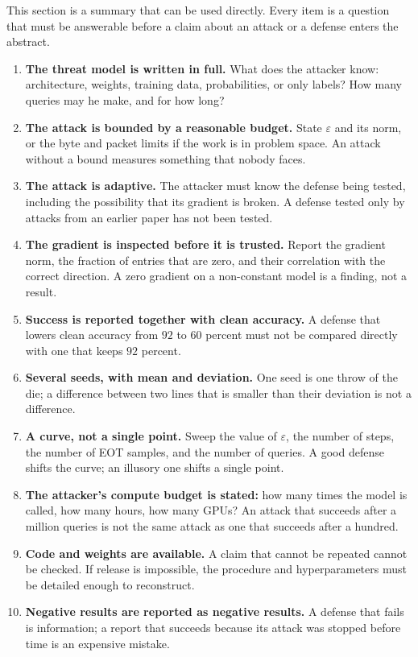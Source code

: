 This section is a summary that can be used directly. Every item is a question
that must be answerable before a claim about an attack or a defense enters the
abstract.

\begin{enumerate}
  \item \textbf{The threat model is written in full.} What does the attacker know: architecture,
        weights, training data, probabilities, or only labels? How many queries may he
        make, and for how long?
  \item \textbf{The attack is bounded by a reasonable budget.} State $\varepsilon$
        and its norm, or the byte and packet limits if the work is in problem space. An attack
        without a bound measures something that nobody faces.
  \item \textbf{The attack is adaptive.}
        The attacker must know the defense being tested, including the possibility that
        its gradient is broken. A defense tested only by attacks from an earlier
        paper has not been tested.
  \item \textbf{The gradient is inspected before it is trusted.} Report the gradient norm, the fraction
        of entries that are zero, and their correlation with the correct direction. A zero gradient on a
        non-constant model is a finding, not a result.
  \item \textbf{Success is reported together with clean accuracy.} A defense that
        lowers clean accuracy from $92$ to $60$ percent must not be compared
        directly with one that keeps $92$ percent.
  \item \textbf{Several seeds, with mean and deviation.} One seed is one
        throw of the die; a difference between two lines that is smaller than their
        deviation is not a difference.
  \item \textbf{A curve, not a single point.} Sweep the value of $\varepsilon$, the number of steps,
        the number of EOT samples, and the number of queries. A good defense shifts the curve;
        an illusory one shifts a single point.
  \item \textbf{The attacker's compute budget is stated:} how many times the model is called,
        how many hours, how many GPUs? An attack that succeeds after a million queries is not
        the same attack as one that succeeds after a hundred.
  \item \textbf{Code and weights are available.} A claim that cannot be repeated cannot be
        checked. If release is impossible, the procedure and hyperparameters must be detailed
        enough to reconstruct.
  \item \textbf{Negative results are reported as negative results.} A defense that fails
        is information; a report that succeeds because its attack was stopped before
        time is an expensive mistake.
\end{enumerate}

